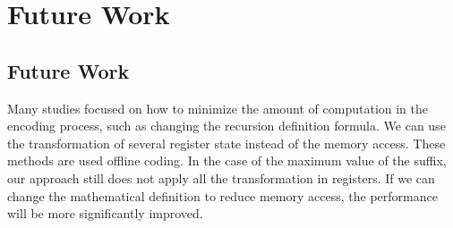 \ifdefined\MasterThesis
\chapter{Future Work}
\else
\section{Future Work}
\fi
\label{sec:Future}

Many studies focused on how to minimize the amount of computation in
the encoding process, such as changing the recursion definition
formula.  We can use the transformation of several register state
instead of the memory access.  These methods are used offline coding.
In the case of the maximum value of the suffix,  our approach still
does not apply all the transformation in registers.  If we can change
the mathematical definition to reduce memory access, the performance
will be more significantly improved.
